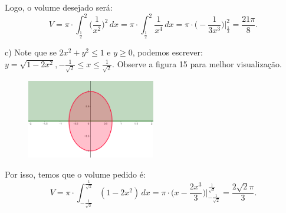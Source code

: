 \documentclass{article}
\begin{document}
{\begin{newpage}
\begin{figure}[htbp]
\begin{center}
\end{center}
\caption{}
\end{figure}
\par Logo, o volume desejado será:
\begin{equation*}\displaystyle{V = \pi\cdot\int_{\frac{1}{2}}^{2} \Big(\frac{1}{x^{2}}\Big)^{2}\, dx = \pi\cdot\int_{\frac{1}{2}}^{2} \frac{1}{x^{4}}\, dx = \pi\cdot \Big(-\frac{1}{3x^{3}}\Big)\Big|^{2}_{\frac{1}{2}} = \frac{21\pi }{8}.}\end{equation*}
\par
\vspace{0.3cm}
c) Note que se $\displaystyle{2x^2 + y^2 \leq 1}$ e $\displaystyle{y\geq 0}$, podemos escrever: $\displaystyle{y=\sqrt{1 - 2x^{2}}, -\frac{1}{\sqrt{2}}\leq x\leq \frac{1}{\sqrt{2}}}$. Observe a figura 15 para melhor visualização.
\begin{figure}[htbp]
\begin{center}
\includegraphics[width=0.5\textwidth, angle=0]{Grafico19.png}
\end{center}
\caption{}
\end{figure}
\par Por isso, temos que o volume pedido é:
\begin{equation*}\displaystyle{V = \pi\cdot\int_{-\frac{1}{\sqrt{2}}}^{\frac{1}{\sqrt{2}}} (1 - 2x^{2})\, dx = \pi\cdot\Big( x - \frac{2x^{3}}{3}\Big)\Big|^{\frac{1}{\sqrt{2}}}_{-\frac{1}{\sqrt{2}}} = \frac{2\sqrt{2}\pi}{3}.}\end{equation*}
\par
\vspace{0.3cm}

\end{newpage}}
\end{document}
